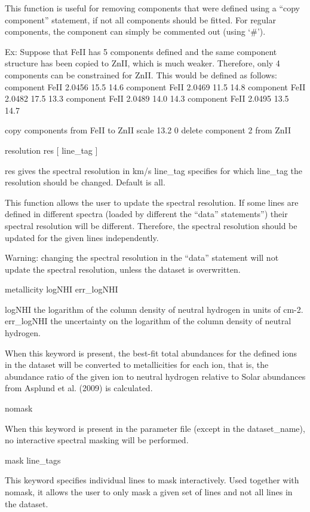 \documentclass[letterpaper,10pt,english]{sphinxmanual}
\begin{document}
This function is useful for removing components that were defined using a “copy component” statement, if not all components should be fitted. For regular components, the component can simply be commented out (using ‘\#’).

Ex:
Suppose that FeII has 5 components defined and the same component structure has been copied to ZnII, which is much weaker. Therefore, only 4 components can be constrained for ZnII. This would be defined as follows:
component FeII  2.0456  15.5  14.6
component FeII  2.0469  11.5  14.8
component FeII  2.0482  17.5  13.3
component FeII  2.0489  14.0  14.3
component FeII  2.0495  13.5  14.7

copy components from FeII to ZnII  scale 13.2  0
delete component 2 from ZnII

resolution  res  {[} line\_tag {]}

res             gives the spectral resolution in km/s
line\_tag        specifies for which line\_tag the resolution should be changed. Default is all.

This function allows the user to update the spectral resolution. If some lines are defined in different spectra (loaded by different the “data” statements”) their spectral resolution will be different. Therefore, the spectral resolution should be updated for the given lines independently.

Warning: changing the spectral resolution in the “data” statement will not update the spectral resolution, unless the dataset is overwritten.

metallicity  logNHI  err\_logNHI

logNHI          the logarithm of the column density of neutral hydrogen in units of cm-2.
err\_logNHI      the uncertainty on the logarithm of the column density of neutral hydrogen.

When this keyword is present, the best-fit total abundances for the defined ions in the dataset will be converted to metallicities for each ion, that is, the abundance ratio of the given ion to neutral hydrogen relative to Solar abundances from Asplund et al. (2009) is calculated.

nomask

When this keyword is present in the parameter file (except in the dataset\_name), no interactive spectral masking will be performed.

mask  line\_tags

This keyword specifies individual lines to mask interactively. Used together with nomask, it allows the user to only mask a given set of lines and not all lines in the dataset.
\end{document}
